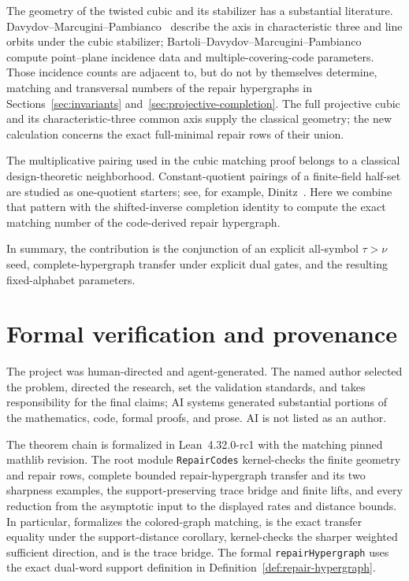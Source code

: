 \documentclass[11pt]{article}
\theoremstyle{definition}
\theoremstyle{remark}
\begin{document}
The geometry of the twisted cubic and its stabilizer has a substantial
literature.  Davydov--Marcugini--Pambianco~\cite{DavydovEtAl2021} describe
the axis in characteristic three and line orbits under the cubic stabilizer;
Bartoli--Davydov--Marcugini--Pambianco~\cite{BartoliEtAl2020} compute
point--plane incidence data and multiple-covering-code parameters.  Those
incidence counts are adjacent to, but do not by themselves determine,
matching and transversal numbers of the repair hypergraphs in
Sections~\ref{sec:invariants} and~\ref{sec:projective-completion}.  The full
projective cubic and its characteristic-three common axis supply the
classical geometry; the new calculation concerns the exact full-minimal
repair rows of their union.

The multiplicative pairing used in the cubic matching proof belongs to a
classical design-theoretic neighborhood.  Constant-quotient pairings of a
finite-field half-set are studied as one-quotient starters; see, for example,
Dinitz~\cite{Dinitz1984}.  Here we combine that pattern with the
shifted-inverse completion identity to compute the exact matching number of
the code-derived repair hypergraph.

In summary, the contribution is the conjunction of an explicit all-symbol
$\tau>\nu$ seed, complete-hypergraph transfer under explicit dual gates, and
the resulting fixed-alphabet parameters.

\section{Formal verification and provenance}
\label{sec:verification}

The project was human-directed and agent-generated.  The named author
selected the problem, directed the research, set the validation standards,
and takes responsibility for the final claims; AI systems generated
substantial portions of the mathematics, code, formal proofs, and prose.
AI is not listed as an author.

The theorem chain is formalized in Lean~4.32.0-rc1 with the matching pinned
mathlib revision.  The root module \texttt{RepairCodes} kernel-checks the
finite geometry and repair rows, complete bounded repair-hypergraph transfer
and its two sharpness examples, the support-preserving trace bridge and
finite lifts, and every reduction from the asymptotic input to the displayed
rates and distance bounds.  In particular,
 formalizes the colored-graph matching,
 is the exact transfer
equality under the support-distance corollary,
 kernel-checks
the sharper weighted sufficient direction, and
 is the trace
bridge.  The formal \texttt{repairHypergraph} uses the exact dual-word
support definition in Definition~\ref{def:repair-hypergraph}.
\end{document}
